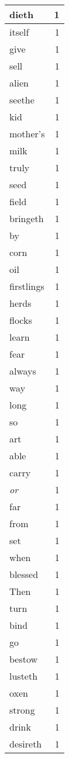\begin{center}
\begin{longtable}{l|r}
dieth & 1 \\ \hline
itself & 1 \\ \hline
give & 1 \\ \hline
sell & 1 \\ \hline
alien & 1 \\ \hline
seethe & 1 \\ \hline
kid & 1 \\ \hline
mother's & 1 \\ \hline
milk & 1 \\ \hline
truly & 1 \\ \hline
seed & 1 \\ \hline
field & 1 \\ \hline
bringeth & 1 \\ \hline
by & 1 \\ \hline
corn & 1 \\ \hline
oil & 1 \\ \hline
firstlings & 1 \\ \hline
herds & 1 \\ \hline
flocks & 1 \\ \hline
learn & 1 \\ \hline
fear & 1 \\ \hline
always & 1 \\ \hline
way & 1 \\ \hline
long & 1 \\ \hline
so & 1 \\ \hline
art & 1 \\ \hline
able & 1 \\ \hline
carry & 1 \\ \hline
\emph{or} & 1 \\ \hline
far & 1 \\ \hline
from & 1 \\ \hline
set & 1 \\ \hline
when & 1 \\ \hline
blessed & 1 \\ \hline
Then & 1 \\ \hline
turn & 1 \\ \hline
bind & 1 \\ \hline
go & 1 \\ \hline
bestow & 1 \\ \hline
lusteth & 1 \\ \hline
oxen & 1 \\ \hline
strong & 1 \\ \hline
drink & 1 \\ \hline
desireth & 1 \\ \hline

\end{longtable}
\end{center}

